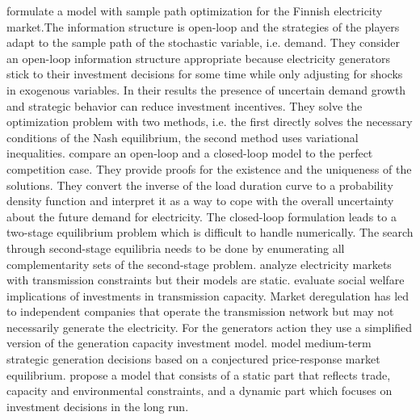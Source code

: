 \cite{Pineau2003} formulate a model with sample path optimization for the Finnish electricity market.The information structure is open-loop and the strategies of the players adapt to the sample path of the stochastic variable, i.e. demand. They consider an open-loop information structure appropriate because electricity generators stick to their investment decisions for some time while only adjusting for shocks in exogenous variables. In their results the presence of uncertain demand growth and strategic behavior can reduce investment incentives. They solve the optimization problem with two methods, i.e. the first directly solves the necessary conditions of the Nash equilibrium, the second method uses variational inequalities. \cite{Murphy2005} compare an open-loop and a closed-loop model to the perfect competition case. They provide proofs for the existence and the uniqueness of the solutions. They convert the inverse of the load duration curve to a probability density function and interpret it as a way to cope with the overall uncertainty about the future demand for electricity. The closed-loop formulation leads to a two-stage equilibrium problem which is difficult to handle numerically. The search through second-stage equilibria needs to be done by enumerating all complementarity sets of the second-stage problem.
\cite{Neuhoff2005} analyze electricity markets with transmission constraints but their models are static. \cite{Sauma2006} evaluate social welfare implications of investments in transmission capacity. Market deregulation has led to independent companies that operate the transmission network but may not necessarily generate the electricity. For the generators action they use a simplified version of the \cite{Murphy2005} generation capacity investment model. \cite{Centeno2007} model medium-term strategic generation decisions based on a conjectured price-response market equilibrium. \cite{Lise2008} propose a model that consists of a static part that reflects trade, capacity and environmental constraints, and a dynamic part which focuses on investment decisions in the long run. 

